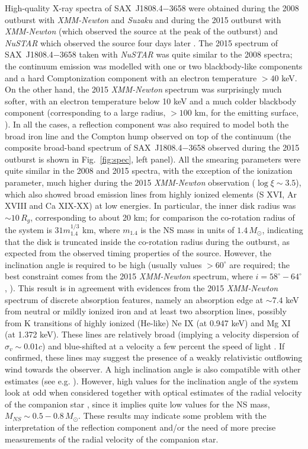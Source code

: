 \documentclass[graybox]{svmult}
\def \xmm {{\em XMM-Newton\xspace}}
\def \suzaku {{\em Suzaku\xspace}}
\def \saxj{{\rm SAX~J1808.4$-$3658\xspace}}
\def \nustar{{\em NuSTAR\xspace}}
\begin{document}
High-quality X-ray spectra of \saxj{} were obtained during the 2008 outburst with \xmm{} \cite{Papitto2009} and \suzaku{} \cite{Cackett2009} and during the 2015 outburst with \xmm{} (which observed the source at the peak of the outburst) and \nustar{} which observed the source four days later \cite{DiSalvo2019}. The 2015 spectrum of \saxj{} taken with \nustar{} was quite similar to the 2008 spectra; the continuum emission was modelled with one or two blackbody-like components and a hard Comptonization component with an electron temperature $> 40$ keV. On the other hand, the 2015 \xmm{} spectrum was surprisingly much softer, with an electron temperature below 10 keV and a much colder blackbody component (corresponding to a large radius, $> 100$ km, for the emitting surface, \cite{DiSalvo2019}). 
In all the cases, a reflection component was also required to model both the broad iron line and the Compton hump observed on top of the continuum (the composite broad-band spectrum of \saxj{} observed during the 2015 outburst is shown in Fig.~\ref{fig:spec}, left panel). All the smearing parameters were quite similar in the 2008 and 2015 spectra, with the exception of the ionization parameter, much higher during the 2015 \xmm{} observation ($\log \xi \sim 3.5$),
which also showed broad emission lines from highly ionized elements (S XVI, Ar XVIII and Ca XIX-XX) at low energies. In particular, the inner disk radius was $\sim 10\, R_g$, corresponding to about 20 km; for comparison the co-rotation radius of the system is $31 m_{1.4}^{1/3}$ km, where $m_{1.4}$ is the NS mass in units of $1.4\, M_\odot$, indicating that the disk is truncated inside the co-rotation radius during the outburst, as expected from the observed timing properties of the source. 
However, the inclination angle is required to be high (usually values $> 60^\circ$ are required; the best constraint comes from the 2015 \xmm{} spectrum, where $i = 58^\circ-64^\circ$, \cite{DiSalvo2019}). This result is in agreement with evidences from the 2015 \xmm{} spectrum of discrete absorption features, namely an absorption edge at $\sim 7.4$ keV from neutral or mildly ionized iron and at least two absorption lines, possibly from K transitions of highly ionized (He-like) Ne IX (at 0.947 keV) and Mg XI (at 1.372 keV). These lines are relatively broad (implying a velocity dispersion of $\sigma_v \sim 0.01c$) and blue-shifted at a velocity a few percent the speed of light \cite{DiSalvo2019}. If confirmed, these lines may suggest the presence of a weakly relativistic outflowing wind towards the observer. A high inclination angle is also compatible with other estimates (see e.g. \cite{Ibragimov2009,Deloye2008,Bildsten2001,Wang2013}). However, high values for the inclination angle of the system look at odd when considered together with optical estimates of the radial velocity of the companion star \cite{Elebert2008,Cornelisse2009}, since it implies quite low values for the NS mass, $M_{NS} \sim 0.5-0.8\, M_\odot$. These results may indicate some problem with the interpretation of the reflection component and/or the need of more precise measurements of the radial velocity of the companion star. 
\end{document}
